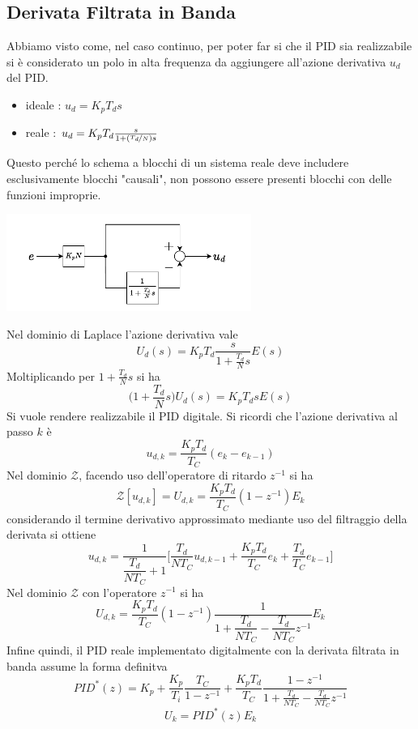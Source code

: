 \documentclass[10pt, letterpaper]{report}
\begin{document}
\subsection{Derivata Filtrata in Banda}
Abbiamo visto come, nel caso continuo, per poter far si che il PID sia realizzabile si è considerato un polo in alta frequenza da aggiungere  all'azione derivativa $u_d$ del PID.
\begin{itemize}
    \item ideale : $u_d=K_pT_ds$
    \item reale :  $u_d=K_pT_d\frac{s}{1+(\nicefrac{T_d}{N})s}$
\end{itemize}
Questo perché lo schema a blocchi di un sistema reale deve includere esclusivamente blocchi "causali", non possono essere presenti blocchi con delle funzioni improprie.
\begin{center}
    \includegraphics[width=0.6\textwidth]{images/azioneDerivativa.pdf}
\end{center}
Nel dominio di Laplace l'azione derivativa vale 
$$ U_d(s)=K_pT_d\frac{s}{1+\frac{T_d}{N}s}E(s)$$
Moltiplicando per  $1+\frac{T_d}{N}s$ si ha 
$$ \Big(1+\frac{T_d}{N}s \Big)U_d(s)=K_pT_dsE(s)$$
Si vuole rendere realizzabile il PID digitale. Si ricordi che l'azione derivativa al passo $k$ è 
$$ u_{d,k}=\frac{K_pT_d}{T_C}(e_{k}-e_{k-1})$$
Nel dominio $\mathcal Z$, facendo uso dell'operatore di ritardo $z^{-1}$ si ha
$$ \mathcal{Z}[u_{d,k}]=U_{d,k}=\frac{K_pT_d}{T_C}(1-z^{-1})E_k$$
considerando il termine derivativo approssimato mediante uso del filtraggio della derivata si ottiene 
$$u_{d,k}=\frac{1}{\dfrac{T_d}{NT_C}+1}\Big[
\frac{T_d}{NT_C}u_{d,k-1}+     
\frac{K_pT_d}{T_C}e_k+ 
\frac{T_d}{T_C}e_{k-1}
\Big]$$
Nel dominio $\mathcal{Z}$ con l'operatore $z^{-1}$ si ha 
$$ 
U_{d,k}=\frac{K_pT_d}{T_C}(1-z^{-1})\frac{1}{
    1+\dfrac{T_d}{NT_C}-\dfrac{T_d}{NT_C}z^{-1}
}E_k
$$
Infine quindi, il PID reale implementato digitalmente con la derivata filtrata in banda assume la forma definitva 
$$ 
PID^*(z)=K_p+\frac{K_p}{T_i}\frac{T_C}{1-z^{-1}}+\frac{K_pT_d}{T_C}\frac{1-z^{-1}}{1+\frac{T_d}{NT_C}-\frac{T_d}{NT_C}z^{-1}}
$$
$$ 
U_k=PID^*(z)E_k
$$
\end{document}
